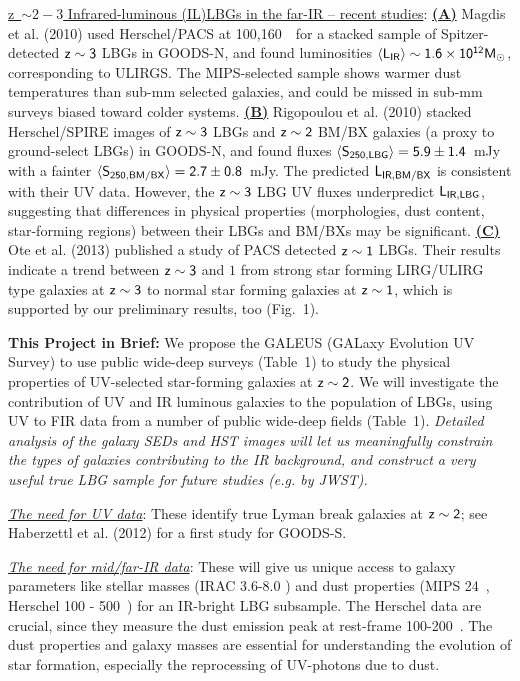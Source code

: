 \documentclass[12pt]{article}
\begin{document}
\hspace{0.1in}
\underline{z~$\sim 2-3$ Infrared-luminous (IL)LBGs in the far-IR -- recent studies}:
\underline{\bf (A)} Magdis et al. (2010) used Herschel/PACS
at 100,160~\mum\ for a stacked sample of Spitzer-detected
$\sf z\sim 3$ LBGs in GOODS-N, and found luminosities
$\sf \langle L_{IR}\rangle \sim 1.6\times 10^{12}M_\odot$, 
corresponding to ULIRGS.
The MIPS-selected sample shows warmer dust temperatures than sub-mm
selected galaxies, and could be missed in sub-mm surveys
biased toward colder systems.
\underline{\bf (B)} Rigopoulou et al. (2010) stacked Herschel/SPIRE images of
$\sf z\sim 3$ LBGs and $\sf z\sim 2$ BM/BX galaxies (a proxy to ground-select LBGs) 
in GOODS-N, and found fluxes 
$\sf \langle S_{250,LBG}\rangle =5.9\pm 1.4$~mJy 
with a fainter $\sf \langle S_{250,BM/BX}\rangle =2.7\pm 0.8$~mJy.  
The predicted $\sf L_{IR,BM/BX}$
is consistent with their UV data.  However,
the $\sf z\sim 3$ LBG UV fluxes
underpredict $\sf L_{IR,LBG}$, suggesting
that differences in physical properties 
(morphologies, dust content, star-forming regions)
between their LBGs and BM/BXs may be
significant.
\underline{\bf (C)} Ote et al. (2013) published a study of PACS detected $\sf z\sim 1$
LBGs. Their results indicate a trend between $\sf z\sim 3$ and $1$
from strong star forming LIRG/ULIRG type galaxies at $\sf z\sim 3$ to
normal star forming galaxies at $\sf z\sim 1$, which is supported
by our preliminary results, too (Fig.~1).  


\hspace{0.1in}
{\bf This Project in Brief:} We propose the 
GALEUS (GALaxy Evolution UV Survey) to use
public wide-deep surveys (Table~1) to study the physical
properties of UV-selected star-forming galaxies at $\sf z\sim 2$. We will
investigate the contribution of UV and IR luminous galaxies to the
population of LBGs, using UV to FIR data from a number of public wide-deep
fields (Table~1). 
{\it Detailed analysis of the galaxy SEDs and HST images will
let us meaningfully constrain the types of galaxies
contributing to the IR background, and construct a very useful true
LBG sample for future studies (e.g. by JWST).}

\hspace{0.1in}
\underline{\it The need for UV data}:  These identify 
true Lyman break galaxies at
$\sf z\sim 2$; see Haberzettl et al. (2012) for a first study for GOODS-S. 


\hspace{0.1in}
\underline{\it The need for mid/far-IR data}:  These 
will give us unique access to galaxy parameters like stellar
masses (IRAC 3.6-8.0 \mum) and dust properties (MIPS 24~\mum, Herschel
100 - 500~\mum) for an IR-bright LBG subsample. The Herschel data are
crucial, since they measure the dust emission peak
at rest-frame 100-200~\mum .
The dust properties and galaxy masses are
essential for understanding the evolution of star formation,
especially the reprocessing of UV-photons due to dust.
\end{document}
